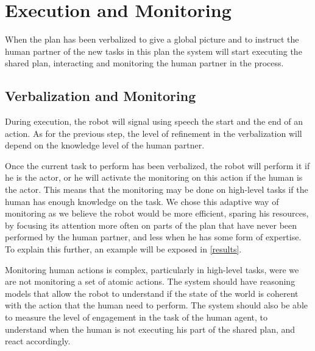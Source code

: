\documentclass{llncs}
\begin{document}
%


\section{Execution and Monitoring}
\label{execution1}

When the plan has been verbalized to give a global picture and to instruct the human partner of the new tasks in this plan the system will start executing the shared plan, interacting and monitoring the human partner in the process.

\subsection{Verbalization and Monitoring}
During execution,  the robot will signal using speech the start and the end of an action. As for the previous step, the level of refinement in the verbalization will depend on the knowledge level of the human partner.


Once the current task to perform has been verbalized, the robot will perform it if he is the actor, or he will activate the monitoring on this action if the human is the actor. This means that the monitoring may be done on high-level tasks if the human has enough knowledge on the task.
We chose this adaptive way of monitoring as we believe the robot would be more efficient, sparing his resources, by focusing its attention more often on parts of the plan that have never been performed by the human partner, and less when he has some form of expertise.
To explain this further, an example will be exposed in \ref{results}.

Monitoring human actions is complex, particularly in high-level tasks, were we are not monitoring a set of atomic actions. The system should have reasoning models that allow the robot to understand if the state of the world is coherent with the action that the human need to perform. The system should also be able to measure the level of engagement in the task of the human agent, to understand when the human is not executing his part of the shared plan, and react accordingly.
\end{document}
